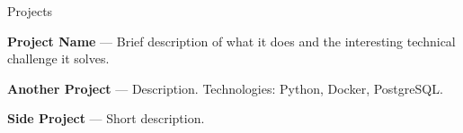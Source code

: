 \begin{rubric}{Projects}

\entry*[YEAR]%
    \textbf{Project Name} — Brief description of what it does and the interesting technical challenge it solves.
    \href{https://github.com/YOUR_GITHUB/PROJECT}{\faGithub}

\entry*[YEAR]%
    \textbf{Another Project} — Description. Technologies: Python, Docker, PostgreSQL.
    \href{https://github.com/YOUR_GITHUB/PROJECT}{\faGithub}

\entry*[YEAR]%
    \textbf{Side Project} — Short description.

\end{rubric}
